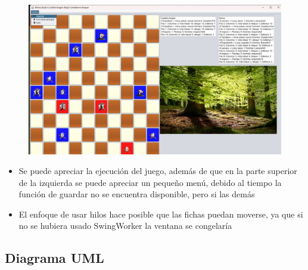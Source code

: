 \documentclass{article}
\begin{document}
	\begin{figure}[H]
		\centering
		\includegraphics[width=1\textwidth,keepaspectratio]{img/test.jpg}
	\end{figure}
	
	\begin{itemize}	
		\item Se puede apreciar la ejecución del juego, además de que en la parte superior de la izquierda se puede apreciar un pequeño menú, debido al tiempo la función de guardar no se encuentra disponible, pero si las demás
	\end{itemize}
	
	
	
	
	
	
	
	\begin{itemize}	
		\item El enfoque de usar hilos hace posible que las fichas puedan moverse, ya que si no se hubiera usado SwingWorker la ventana se congelaría 
	\end{itemize}
	
	
	
	\subsection{Diagrama UML}
	
\end{document}
